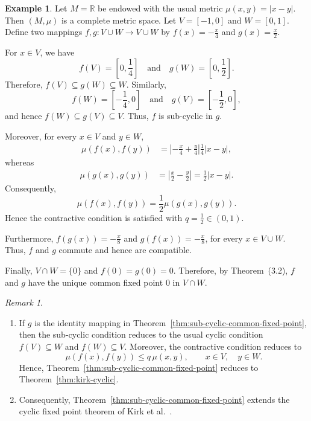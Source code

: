 \documentclass[11pt,a4paper,margin=1in]{amsart}
\theoremstyle{plain}
\theoremstyle{definition}
\newtheorem{example}[theorem]{Example}
\theoremstyle{remark}
\newtheorem{remark}[theorem]{Remark}
\begin{document}
\begin{example}\label{exmp:sub-cyclic-example}
Let $M=\mathbb{R}$ be endowed with the usual metric $\mu(x,y)=|x-y|$. Then $(M,\mu)$ is a complete metric space. Let $V=[-1,0]$ and $W=[0,1]$. Define two mappings $f,g:V\cup W\to V\cup W$ by $f(x)=-\frac{x}{4}$ and $g(x)=\frac{x}{2}$.

For $x\in V$, we have
\[
f(V)=\left[0,\frac14\right]
\quad\text{and}\quad
g(W)=\left[0,\frac12\right].
\]
Therefore, $f(V)\subseteq g(W)\subseteq W$. Similarly,
\[
f(W)=\left[-\frac14,0\right]
\quad\text{and}\quad
g(V)=\left[-\frac12,0\right],
\]
and hence $f(W)\subseteq g(V)\subseteq V$. Thus, $f$ is sub-cyclic in $g$.

Moreover, for every $x\in V$ and $y\in W$,
\[
\begin{aligned}
\mu(f(x),f(y))
&=
\left|-\frac{x}{4}+\frac{y}{4}\right| 
\frac14|x-y|,
\end{aligned}
\]
whereas
\[
\begin{aligned}
\mu(g(x),g(y))
&=
\left|\frac{x}{2}-\frac{y}{2}\right| =
\frac12|x-y|.
\end{aligned}
\]
Consequently,
\[
\mu(f(x),f(y))
=
\frac12\mu(g(x),g(y)).
\]
Hence the contractive condition is satisfied with $q=\frac12\in(0,1)$. 

Furthermore, $f(g(x)) = -\frac{x}{8} $ and $g(f(x)) = -\frac{x}{8}$, 
for every $x\in V\cup W$. Thus, $f$ and $g$ commute and hence are
compatible.

Finally, $V\cap W=\{0\}$ and $f(0)=g(0)=0$. Therefore, by Theorem~\textup{(3.2)}, $f$ and $g$ have the unique common
fixed point $0$ in $V\cap W$.
\end{example}

\begin{remark}\label{rk:generalization}\hfill
\begin{enumerate}
    \item If $g$ is the identity mapping in
    Theorem~\ref{thm:sub-cyclic-common-fixed-point}, then the
    sub-cyclic condition reduces to the usual cyclic condition $f(V)\subseteq W$ and $ f(W)\subseteq V$.    Moreover, the contractive condition reduces to
    \[
    \mu(f(x),f(y))\leq q\,\mu(x,y),
    \qquad x\in V,\quad y\in W.
    \]
    Hence, Theorem~\ref{thm:sub-cyclic-common-fixed-point} reduces to
    Theorem~\ref{thm:kirk-cyclic}.

    \item Consequently,
    Theorem~\ref{thm:sub-cyclic-common-fixed-point} extends the cyclic
    fixed point theorem of Kirk et al.~\cite{W.12}.
\end{enumerate}
\end{remark}
\end{document}
